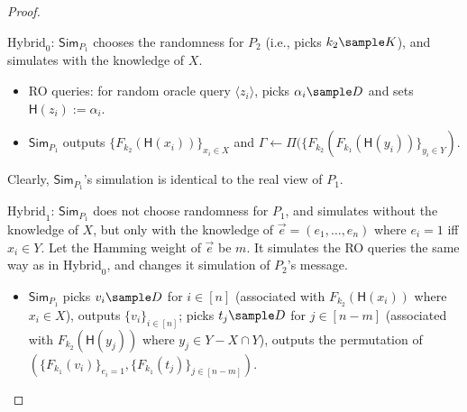 \documentclass[a4paper,10pt]{article}
\begin{document}
\begin{proof}
\begin{trivlist}
\item $\text{Hybrid}_0$: $\mathsf{Sim}_{P_1}$ chooses the randomness for $P_2$ (i.e., picks $k_2 \sample K$), 
    and simulates with the knowledge of $X$. 
\begin{itemize}
    \item RO queries: for random oracle query $\langle z_i \rangle$, 
        picks $\alpha_i \sample D$ and sets $\mathsf{H}(z_i):=\alpha_i$. 

    \item $\mathsf{Sim}_{P_1}$ outputs 
        $\{F_{k_2}(\mathsf{H}(x_i))\}_{x_i \in X}$ 
        and $\Gamma \leftarrow \Pi(\{F_{k_2}(F_{k_1}(\mathsf{H}(y_i))\}_{y_i \in Y})$.      
\end{itemize}
Clearly, $\mathsf{Sim}_{P_1}$'s simulation is identical to the real view of $P_1$. 

\begin{center}
\end{center}

\item $\text{Hybrid}_1$: $\mathsf{Sim}_{P_1}$ does not choose randomness for $P_1$, 
    and simulates without the knowledge of $X$, 
    but only with the knowledge of $\vec{e} = (e_1, \dots, e_n)$ where $e_i = 1$ iff $x_i \in Y$.  
    Let the Hamming weight of $\vec{e}$ be $m$. It simulates the RO queries the same way as in $\text{Hybrid}_0$, 
    and changes it simulation of $P_2$'s message. 
\begin{itemize}
    \item $\mathsf{Sim}_{P_1}$ picks $v_i \sample D$ for $i \in [n]$ 
        (associated with $F_{k_2}(\mathsf{H}(x_i))$ where $x_i \in X$), 
        outputs $\{v_i\}_{i \in [n]}$; 
        picks $t_j \sample D$ for $j \in [n-m]$ (associated with $F_{k_2}(\mathsf{H}(y_j))$ where $y_j \in Y - X \cap Y$),  
        outputs the permutation of $(\{F_{k_1}(v_i)\}_{e_i = 1}, \{F_{k_1}(t_j)\}_{j \in [n-m]})$.                
\end{itemize}


\end{trivlist}
\end{proof}
\end{document}
